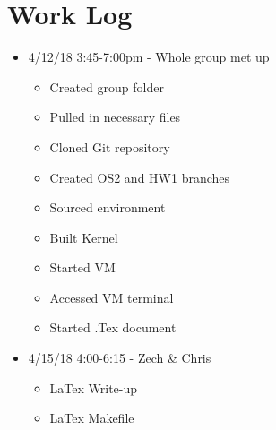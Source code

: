 \documentclass[a4paper, 10pt, draftclsnofoot, onecolumn]{article}
\begin{document}
\section{Work Log}
\begin{itemize}
\item 4/12/18 3:45-7:00pm - Whole group met up
\begin{itemize}
\item Created group folder
\item Pulled in necessary files
\item Cloned Git repository
\item Created OS2 and HW1 branches
\item Sourced environment
\item Built Kernel
\item Started VM
\item Accessed VM terminal
\item Started .Tex document
\end{itemize}
\end{itemize}

\begin{itemize}
\item 4/15/18 4:00-6:15 - Zech \& Chris
\begin{itemize}
\item LaTex Write-up
\item LaTex Makefile
\end{itemize}
\end{itemize}
\end{document}
